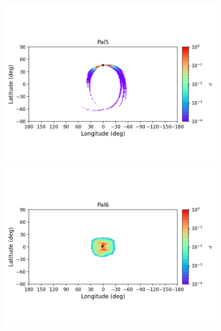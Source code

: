 \begin{figure}
\begin{center}
                \includegraphics[clip=true, trim = 0mm 20mm 0mm 10mm, width=1\columnwidth]{images/error_plots_Pal5.png}
                \includegraphics[clip=true, trim = 0mm 20mm 0mm 10mm, width=1\columnwidth]{images/error_plots_Pal6.png}
                

\end{center}
\end{figure}
